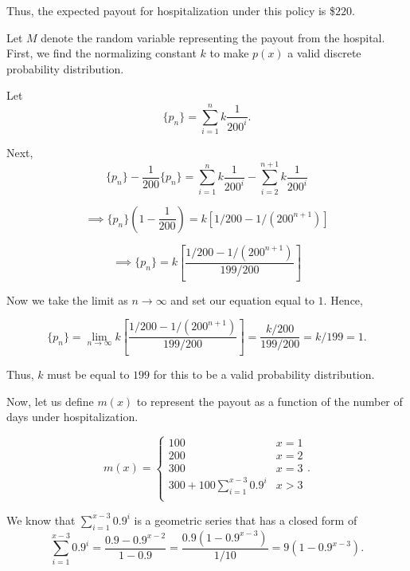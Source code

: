 \documentclass{report}
\begin{document}
Thus, the expected payout for hospitalization under this policy is \$$220$.

\pagebreak
{}

\sol

Let $M$ denote the random variable representing the payout from the hospital. First, we find the normalizing constant $k$ to make $p(x)$ a valid discrete probability distribution. 

Let $$\{p_n\} = \sum_{i =1}^{n}k \frac{1}{200^i}.$$

Next, $$ \{p_n\} - \frac{1}{200}\{p_n\} = \sum_{i =1}^{n}k \frac{1}{200^i}  - \sum_{i = 2}^{n+1}k \frac{1}{200^i}  $$

$$\implies \{p_n\}(1- \frac{1}{200}) = k\left[1/200  - 1/(200^{n+1}) \right] $$

$$\implies \{p_n\} =k\left[ \frac{1/200  - 1/(200^{n+1}) }{199/200} \right]$$

Now we take the limit as $n \rightarrow  \infty$ and set our equation equal to $1.$ Hence,


$$ \{p_n\} = \lim_{n \rightarrow  \infty} k\left[\frac{1/200  - 1/(200^{n+1}) }{199/200}\right] =  \frac{k/200 }{199/200} = k/199 = 1.$$

Thus, $k$ must be equal to $199$ for this to be a valid probability distribution.

Now, let us define $m(x)$ to represent the payout as a function of the number of days under hospitalization.

$$m(x)= \begin{cases}
  100 & x = 1 \\
  200 & x = 2 \\
  300 & x = 3 \\
  300 + 100\sum_{i = 1}^{x-3} 0.9^i & x > 3 \\
\end{cases}.$$


We know that $\sum_{i = 1}^{x-3} 0.9^i$ is a geometric series that has a closed form of $$ \sum_{i = 1}^{x-3} 0.9^i = \frac{0.9 - 0.9^{x-2}}{ 1-0.9} = \frac{0.9(1 - 0.9^{x-3})}{ 1/10} = 9(1 - 0.9^{x-3}).$$
\end{document}
